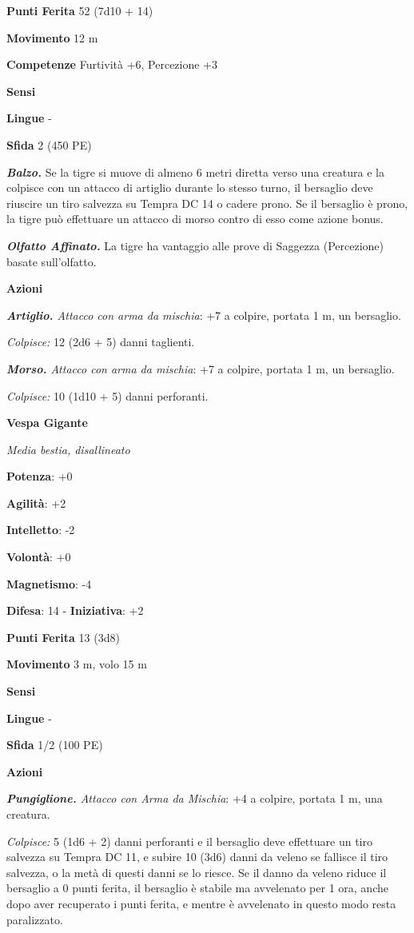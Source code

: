 \begin{multicols}{2}
\textbf{Punti Ferita} 52 (7d10 + 14)

\textbf{Movimento} 12 m

\textbf{Competenze} Furtività +6, Percezione +3

\textbf{Sensi} 

\textbf{Lingue} -

\textbf{Sfida} 2 (450 PE)\smallskip

\emph{\textbf{Balzo.}} Se la tigre si muove di almeno 6 metri diretta
verso una creatura e la colpisce con un attacco di artiglio durante lo
stesso turno, il bersaglio deve riuscire un tiro salvezza su Tempra DC 14
o cadere prono. Se il bersaglio è prono, la tigre può effettuare un
attacco di morso contro di esso come azione bonus.

\emph{\textbf{Olfatto Affinato.}} La tigre ha vantaggio alle prove di
Saggezza (Percezione) basate sull'olfatto.

\smallskip\textbf{Azioni}

\emph{\textbf{Artiglio.} Attacco con arma da mischia}: +7 a colpire,
portata 1 m, un bersaglio.

\emph{Colpisce:} 12 (2d6 + 5) danni taglienti.

\emph{\textbf{Morso.} Attacco con arma da mischia}: +7 a colpire,
portata 1 m, un bersaglio.

\emph{Colpisce:} 10 (1d10 + 5) danni perforanti.

\textbf{Vespa Gigante}

\emph{Media bestia, disallineato}

\textbf{Potenza}: +0

\textbf{Agilità}: +2

\textbf{Intelletto}: -2

\textbf{Volontà}: +0

\textbf{Magnetismo}: -4

\textbf{Difesa}: 14 - \textbf{Iniziativa}: +2

\textbf{Punti Ferita} 13 (3d8)

\textbf{Movimento} 3 m, volo 15 m

\textbf{Sensi} 

\textbf{Lingue} -

\textbf{Sfida} 1/2 (100 PE)\smallskip

\smallskip\textbf{Azioni}

\emph{\textbf{Pungiglione.} Attacco con Arma da Mischia}: +4 a colpire,
portata 1 m, una creatura.

\emph{Colpisce:} 5 (1d6 + 2) danni perforanti e il bersaglio deve
effettuare un tiro salvezza su Tempra DC 11, e subire 10 (3d6)
danni da veleno se fallisce il tiro salvezza, o la metà di questi danni
se lo riesce. Se il danno da veleno riduce il bersaglio a 0 punti
ferita, il bersaglio è stabile ma avvelenato per 1 ora, anche dopo aver
recuperato i punti ferita, e mentre è avvelenato in questo modo resta
paralizzato.


\end{multicols}
